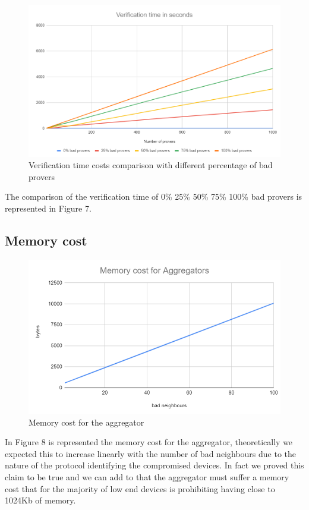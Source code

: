 \documentclass[10pt, a4paper, twocolumn]{article} %
\begin{document}
\begin{figure}
	\includegraphics[width=\linewidth]{images/verification_comparison.png} %
	\caption{Verification time costs comparison with different percentage of bad provers} %
	\label{bear} %
\end{figure}
The comparison of the verification time of 0\% 25\% 50\% 75\% 100\% bad provers is represented in Figure 7.\\

\subsection{Memory cost}
\begin{figure}
	\includegraphics[width=\linewidth]{images/memorycost.png} %
	\caption{Memory cost for the aggregator } %
	\label{bear} %
\end{figure}
In Figure 8 is represented the memory cost for the aggregator, theoretically we expected this to increase linearly with the number of bad neighbours due to the nature of the protocol identifying the compromised devices. In fact we proved this claim to be true and we can add to that the aggregator must suffer a memory cost that for the majority of low end devices is prohibiting having close to 1024Kb of memory.\\
\end{document}
